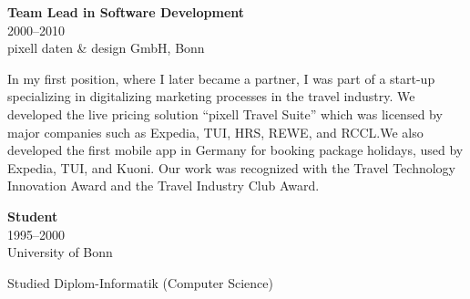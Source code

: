 \documentclass[a4paper,10pt]{article}
\newcommand{\experience}[4]{
  \begin{adjustbox}{}
    \begin{minipage}[t]{0.25\textwidth}
      \textbf{\color{sectionblue}#1} \\
      {\color{sectiongray}#2} \\
      #3\\
    \end{minipage}
    \hspace{1em}
    \begin{minipage}[t]{0.75\textwidth}
      #4\\
    \end{minipage}
  \end{adjustbox}
}
\begin{document}
  \vspace{1em}{\color{sectionblue}\rule{\textwidth}{0.4pt}}\vspace{1em}

  \experience
  {Team Lead in Software Development}
  {2000–2010}
  {pixell daten \& design GmbH, Bonn}
  {In my first position, where I later became a partner, I was part of a start-up specializing in digitalizing marketing processes in the travel industry. We developed the live pricing solution \enquote{pixell Travel Suite} which was licensed by major companies such as Expedia, TUI, HRS, REWE, and RCCL.\@ We also developed the first mobile app in Germany for booking package holidays, used by Expedia, TUI, and Kuoni. Our work was recognized with the Travel Technology Innovation Award and the Travel Industry Club Award.}

  \vspace{1em}{\color{sectionblue}\rule{\textwidth}{0.4pt}}\vspace{1em}

  \experience
  {Student}
  {1995–2000}
  {University of Bonn}
  {Studied Diplom-Informatik (Computer Science)}
\end{document}
